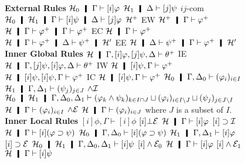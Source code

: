 \begin{figure}
 \small
\centering
  \textbf{External Rules}
   \vskip 2mm
   \BinaryRule
   {$\hyper_0\hmid\G\vdash[i]\phi$}
   {$\hyper_1\hmid\D\vdash[j]\psi$}
   {$ij$-com}
   {$\hyper_0\hmid\hyper_1\hmid\Gamma\vdash[i]\psi\hmid\Delta\vdash[j]\varphi$}
  \hfill
 \UnaryRule
 {$\mathcal{H}^+$}
 {EW}
 {$\hyper^+\hmid\Gamma\vdash \m\varphi$}
 \UnaryRule
 {$\hyper\hmid\Gamma\vdash \m\phi\hmid\Gamma\vdash \m\phi$}
 {EC}
 {$\hyper\hmid\Gamma\vdash \m\phi$}
 \hfill
 \UnaryRule
 {$\hyper\hmid\Gamma\vdash \m\varphi\hmid\Delta\vdash \m\psi\hmid \hyper'$}
 {EE}
 {$\hyper\hmid\Delta\vdash \m\psi   \hmid\Gamma\vdash \m\varphi\hmid
   \hyper'$}
\textbf{Inner Global Rules}
   \UnaryRule
   {$\hyper\hmid\Gamma,[i]\phi,[j]\psi,\Delta\tr\m\theta$}
   {IE}
   {$\hyper\hmid\Gamma,[j]\psi,[i]\phi,\Delta\tr\m\theta$}
   \hfill
   \UnaryRule{$\hyper\hmid\Gamma\vdash\m\varphi$}
   {IW}
   {$\hyper\hmid[i]\psi,\Gamma\vdash\m\varphi$}
   \hfill
   \UnaryRule
   {$\hyper\hmid[i]\psi,[i]\psi,\G\vdash\m\varphi$}
   {IC}
   {$\hyper\hmid[i]\psi,        \G\vdash\m\varphi$}
 \BinaryRule
 {$\hyper_0\hmid\G,\D_0\tr(\phi_i)_{i\in I}$}
 {$\hyper_1\hmid\G,\D_1\tr(\psi_j)_{j\in J}$}
 {$\wedge\mathcal I$}
 {$\hyper_0\hmid\hyper_1\hmid\G,\D_0,\D_1\tr(\phi_k\land\psi_k)_{k\in I\cap J}\sqcup
 (\phi_i)_{i\in I\setminus J}\sqcup (\psi_j)_{j\in J\setminus I}$}
 \UnaryRule
 {$\hyper\hmid \G\tr(\phi_i)_{i\in I}$}
 {$\wedge\mathcal E$}
 {$\hyper\hmid \G\tr(\phi_i)_{i\in J}$}
 where $J$ is a subset of $I$.
\textbf{Inner Local Rules}
   {$[i]\phi,\Gamma\vdash [i]\phi$}
   \hfill
 \UnaryRule{$\hyper\hmid\Gamma\vdash[i]\bot$}
   {$[i]\bot\mathcal E$}
   {$\hyper\hmid\Gamma\vdash[i]\phi$}
  \UnaryRule{$\hyper\hmid[i]\varphi,\G\vdash [i]\psi$}
  {$[i]\supset\mathcal I$}
  {$\hyper\hmid\G\vdash [i](\varphi\supset \psi)$}
  \hfill
  \BinaryRule
  {$\hyper_0\hmid\G,\D_0\vdash [i](\phi\imp\psi)$}
  {$\hyper_1\hmid\G,\D_1\vdash [i]\phi$}
  {$[i]\supset\mathcal E$}
  {$\hyper_0\hmid\hyper_1\hmid\G,\D_0,\D_1\vdash [i]\psi$}
  \UnaryRule{$\hyper\hmid\Gamma\vdash [i](\varphi\wedge\psi)$}
   {$[i]\wedge\mathcal E_0$}
   {$\hyper\hmid\Gamma\vdash[i]\varphi$}
   \hfill
  \UnaryRule{$\hyper\hmid\Gamma\vdash[i](\varphi\wedge\psi)$}
   {$[i]\wedge\mathcal E_1$}
   {$\hyper\hmid\Gamma\vdash[i]\psi$}

\end{figure}
